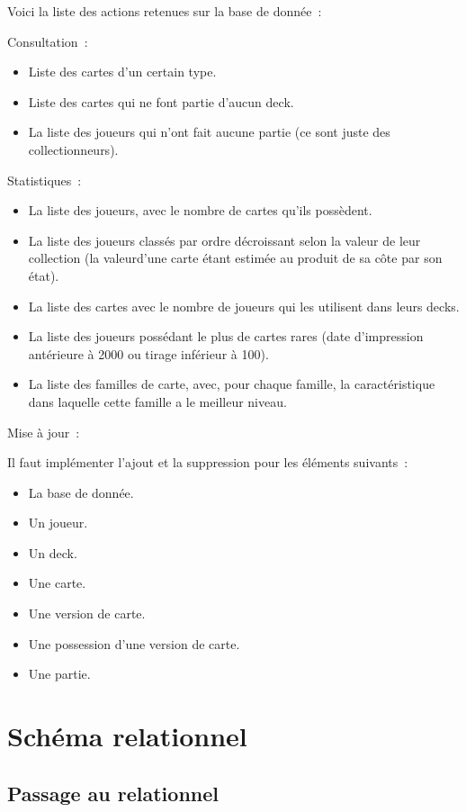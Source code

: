 \documentclass[a4paper,10.5pt]{article}
\begin{document}
Voici la liste des actions retenues sur la base de donnée~:

Consultation~:

\begin{itemize}
  \item Liste des cartes d’un certain type.
  \item Liste des cartes qui ne font partie d’aucun deck.
  \item La liste des joueurs qui n’ont fait aucune partie (ce sont juste des collectionneurs).
\end{itemize}

Statistiques~:

\begin{itemize}
  \item La liste des joueurs, avec le nombre de cartes qu’ils possèdent.
  \item La liste des joueurs classés par ordre décroissant selon la valeur de
    leur collection (la valeurd’une carte étant estimée au produit de sa côte
    par son état).
  \item La liste des cartes avec le nombre de joueurs qui les utilisent dans
    leurs decks.
  \item La liste des joueurs possédant le plus de cartes rares (date
    d’impression antérieure à 2000 ou tirage inférieur à 100).
  \item La liste des familles de carte, avec, pour chaque famille, la
    caractéristique dans laquelle cette famille a le meilleur niveau.
\end{itemize}

Mise à jour~:

Il faut implémenter l'ajout et la suppression pour les éléments suivants~:
\begin{itemize}
  \item La base de donnée.
  \item Un joueur.
  \item Un deck.
  \item Une carte.
  \item Une version de carte.
  \item Une possession d'une version de carte.
  \item Une partie.
\end{itemize}

\section{Schéma relationnel}
\subsection{Passage au relationnel}
\end{document}

